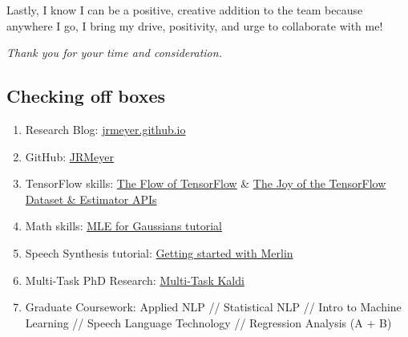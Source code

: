 \documentclass[12pt,a4paper]{article}
\begin{document}
Lastly, I know I can be a positive, creative addition to the team because anywhere I go, I bring my drive, positivity, and urge to collaborate with me!

    
\begin{center}
\textit{Thank you for your time and consideration.}  
\end{center}



\newpage

\subsection*{Checking off boxes}

\begin{enumerate}

\item Research Blog: \href{http://jrmeyer.github.io}{jrmeyer.github.io}

\item GitHub: \href{https://github.com/JRMeyer}{JRMeyer}
  
\item TensorFlow skills: \href{http://jrmeyer.github.io/machinelearning/2016/02/01/TensorFlow-Tutorial.html}{The Flow of TensorFlow} \& \href{http://jrmeyer.github.io/machinelearning/2019/05/29/tensorflow-dataset-estimator-api.html}{The Joy of the TensorFlow Dataset \& Estimator APIs}
  
\item Math skills: \href{http://jrmeyer.github.io/machinelearning/2017/08/18/mle.html}{MLE for Gaussians tutorial}

\item Speech Synthesis tutorial: \href{http://jrmeyer.github.io/tts/2017/02/14/Installing-Merlin.html}{Getting started with Merlin}

\item Multi-Task PhD Research: \href{https://github.com/JRMeyer/multi-task-kaldi}{Multi-Task Kaldi}
  
\item Graduate Coursework: Applied NLP // Statistical NLP // Intro to Machine Learning // Speech Language Technology // Regression Analysis (A + B)

\end{enumerate}
\end{document}
